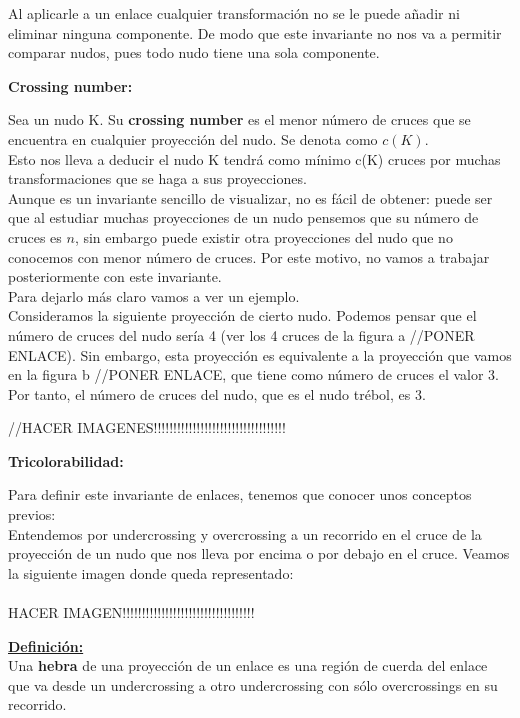 \documentclass[14pt]{extarticle}
\begin{document}
Al aplicarle a un enlace cualquier transformación no se le puede añadir ni eliminar ninguna componente. De modo que este invariante no nos va a permitir comparar nudos, pues todo nudo tiene una sola componente. \\

\bigskip
\begin{center}
	\textbf{Crossing number:}
\end{center}
Sea un nudo K. Su \textbf{crossing number} es el menor número de cruces que se encuentra en cualquier proyección del nudo. Se denota como $c(K)$. \\

Esto nos lleva a deducir el nudo K tendrá como mínimo c(K) cruces por muchas transformaciones que se haga a sus proyecciones.\\

Aunque es un invariante sencillo de visualizar, no es fácil de obtener: puede ser que al estudiar muchas proyecciones de un nudo pensemos que su número de cruces es $n$, sin embargo puede existir otra proyecciones del nudo que no conocemos con menor número de cruces. Por este motivo, no vamos a trabajar posteriormente con este invariante.\\

Para dejarlo más claro vamos a ver un ejemplo.\\
Consideramos la siguiente proyección de cierto nudo. Podemos pensar que el número de cruces del nudo sería 4 (ver los 4 cruces de la figura a //PONER ENLACE). Sin embargo, esta proyección es equivalente a la proyección que vamos en la figura b //PONER ENLACE, que tiene como número de cruces el valor 3. Por tanto, el número de cruces del nudo, que es el nudo trébol, es 3. 

//HACER IMAGENES!!!!!!!!!!!!!!!!!!!!!!!!!!!!!!!!!!    


\begin{center}
	\textbf{Tricolorabilidad:}
\end{center}
Para definir este invariante de enlaces, tenemos que conocer unos conceptos previos:\\
Entendemos por undercrossing y overcrossing a un recorrido en el cruce de la proyección de un nudo que nos lleva por encima o por debajo en el cruce. Veamos la siguiente imagen donde queda representado:\\
\\HACER IMAGEN!!!!!!!!!!!!!!!!!!!!!!!!!!!!!!!!!!

\underline{\textbf{Definición:}}\\
Una\textbf{ hebra }de una proyección de un enlace es una región de cuerda del enlace que va desde un undercrossing a otro undercrossing con sólo overcrossings en su recorrido.\\ 
\end{document}
